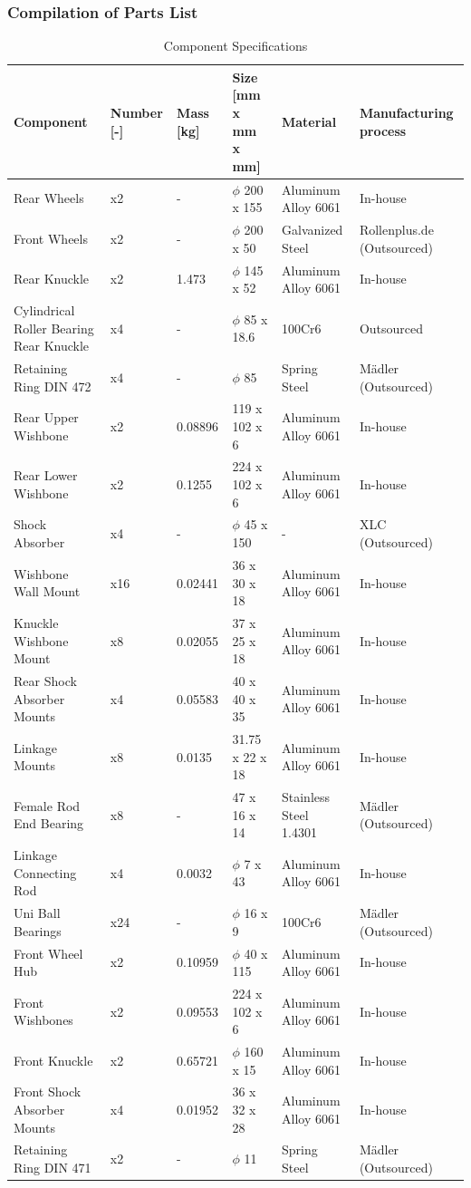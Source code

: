 \subsubsection{Compilation of Parts List}
\begin{table}[H]
\centering
\caption{Component Specifications}
\begin{tabular}{|l|l|l|l|l|l|}
\hline
\textbf{Component} & \textbf{Number [-]} & \textbf{Mass [kg]} & \textbf{Size [mm x mm x mm]} & \textbf{Material} & \textbf{Manufacturing process} \\ \hline
Rear Wheels & x2 & - & $\phi$ 200 x 155 & Aluminum Alloy 6061 & In-house \\ \hline
Front Wheels & x2 & - & $\phi$ 200 x 50 & Galvanized Steel & Rollenplus.de (Outsourced) \\ \hline
Rear Knuckle & x2 & 1.473 & $\phi$ 145 x 52 & Aluminum Alloy 6061 & In-house \\ \hline
Cylindrical Roller Bearing Rear Knuckle & x4 & - & $\phi$ 85 x 18.6 & 100Cr6 & Outsourced \\ \hline
Retaining Ring DIN 472 & x4 & - & $\phi$ 85 & Spring Steel & Mädler (Outsourced) \\ \hline
Rear Upper Wishbone & x2 & 0.08896 & 119 x 102 x 6 & Aluminum Alloy 6061 & In-house \\ \hline
Rear Lower Wishbone & x2 & 0.1255 & 224 x 102 x 6 & Aluminum Alloy 6061 & In-house \\ \hline
Shock Absorber & x4 & - & $\phi$ 45 x 150 & - & XLC (Outsourced) \\ \hline
Wishbone Wall Mount & x16 & 0.02441 & 36 x 30 x 18 & Aluminum Alloy 6061 & In-house \\ \hline
Knuckle Wishbone Mount & x8 & 0.02055 & 37 x 25 x 18 & Aluminum Alloy 6061 & In-house \\ \hline
Rear Shock Absorber Mounts & x4 & 0.05583 & 40 x 40 x 35 & Aluminum Alloy 6061 & In-house \\ \hline
Linkage Mounts & x8 & 0.0135 & 31.75 x 22 x 18 & Aluminum Alloy 6061 & In-house \\ \hline
Female Rod End Bearing & x8 & - & 47 x 16 x 14 & Stainless Steel 1.4301 & Mädler (Outsourced) \\ \hline
Linkage Connecting Rod & x4 & 0.0032 & $\phi$ 7 x 43 & Aluminum Alloy 6061 & In-house \\ \hline
Uni Ball Bearings & x24 & - & $\phi$ 16 x 9 & 100Cr6 & Mädler (Outsourced) \\ \hline
Front Wheel Hub & x2 & 0.10959 & $\phi$ 40 x 115 & Aluminum Alloy 6061 & In-house \\ \hline
Front Wishbones & x2 & 0.09553 & 224 x 102 x 6 & Aluminum Alloy 6061 & In-house \\ \hline
Front Knuckle & x2 & 0.65721 & $\phi$ 160 x 15 & Aluminum Alloy 6061 & In-house \\ \hline
Front Shock Absorber Mounts & x4 & 0.01952 & 36 x 32 x 28 & Aluminum Alloy 6061 & In-house \\ \hline
Retaining Ring DIN 471 & x2 & - & $\phi$ 11 & Spring Steel & Mädler (Outsourced) \\ \hline
\end{tabular}
\end{table}



